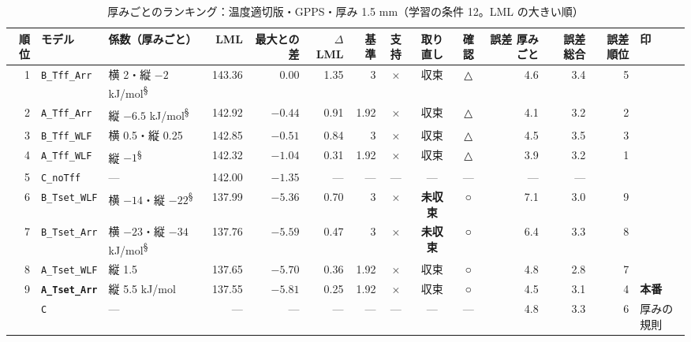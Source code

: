 \documentclass[paper=a4paper,landscape,fontsize=10pt,line_length=62zw,number_of_lines=34]{jlreq}
\let\origtextbf\textbf
\renewcommand{\textbf}[1]{\origtextbf{\gtfamily #1}}   %
\begin{document}
\begin{table}[H]\centering\footnotesize
\caption{厚みごとのランキング：温度適切版・GPPS・厚み 1.5 mm（学習の条件 12。LML の大きい順）}
\begin{tabular}{rlp{11\zw}rrrrccc rrrl}
\toprule
順位 & モデル & 係数（厚みごと） & LML & 最大との差 & $\Delta$LML & 基準 & 支持 & 取り直し & 確認 & 誤差 厚みごと & 誤差 総合 & 誤差順位 & 印 \\
\midrule
1 & \texttt{B\_\allowbreak{}Tff\_\allowbreak{}Arr} & 横 2・縦 $-2$ kJ/mol\textsuperscript{§} & 143.36 & 0.00 & 1.35 & 3 & × & 収束 & △ & 4.6 & 3.4 & 5 &  \\
2 & \texttt{A\_\allowbreak{}Tff\_\allowbreak{}Arr} & 縦 $-6.5$ kJ/mol\textsuperscript{§} & 142.92 & $-0.44$ & 0.91 & 1.92 & × & 収束 & △ & 4.1 & 3.2 & 2 &  \\
3 & \texttt{B\_\allowbreak{}Tff\_\allowbreak{}WLF} & 横 0.5・縦 0.25 & 142.85 & $-0.51$ & 0.84 & 3 & × & 収束 & △ & 4.5 & 3.5 & 3 &  \\
4 & \texttt{A\_\allowbreak{}Tff\_\allowbreak{}WLF} & 縦 $-1$\textsuperscript{§} & 142.32 & $-1.04$ & 0.31 & 1.92 & × & 収束 & △ & 3.9 & 3.2 & 1 &  \\
5 & \texttt{C\_\allowbreak{}noTff} & --- & 142.00 & $-1.35$ & --- & --- & --- & --- & --- & --- & --- &  &  \\
6 & \texttt{B\_\allowbreak{}Tset\_\allowbreak{}WLF} & 横 $-14$・縦 $-22$\textsuperscript{§} & 137.99 & $-5.36$ & 0.70 & 3 & × & \textbf{未収束} & ○ & 7.1 & 3.0 & 9 &  \\
7 & \texttt{B\_\allowbreak{}Tset\_\allowbreak{}Arr} & 横 $-23$・縦 $-34$ kJ/mol\textsuperscript{§} & 137.76 & $-5.59$ & 0.47 & 3 & × & \textbf{未収束} & ○ & 6.4 & 3.3 & 8 &  \\
8 & \texttt{A\_\allowbreak{}Tset\_\allowbreak{}WLF} & 縦 1.5 & 137.65 & $-5.70$ & 0.36 & 1.92 & × & 収束 & ○ & 4.8 & 2.8 & 7 &  \\
9 & \textbf{\texttt{A\_\allowbreak{}Tset\_\allowbreak{}Arr}} & 縦 5.5 kJ/mol & 137.55 & $-5.81$ & 0.25 & 1.92 & × & 収束 & ○ & 4.5 & 3.1 & 4 & \textbf{本番} \\
 & \texttt{C} & --- & --- & --- & --- & --- & --- & --- & --- & 4.8 & 3.3 & 6 & 厚みの規則 \\
\bottomrule
\end{tabular}
\end{table}
\end{document}
